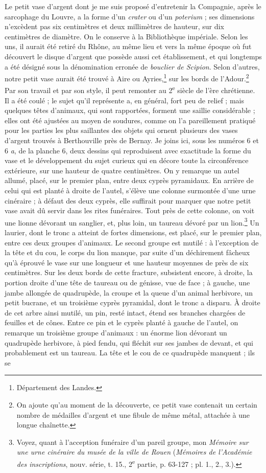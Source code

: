 \documentclass{article}
\begin{document}
Le petit vase d'argent dont je me suis proposé d'entretenir la Compagnie, après le sarcophage du Louvre, a la forme d'un \emph{crater} ou d'un \emph{poterium} ; ses dimensions n'excèdent pas six centimètres et deux millimètres de hauteur, sur dix centimètres de diamètre. On le conserve à la Bibliothèque impériale. Selon les uns, il aurait été retiré du Rhône, au même lieu et vers la même époque où fut découvert le disque d'argent que possède aussi cet établissement, et qui longtemps a été désigné sous la dénomination erronée de \emph{bouclier de Scipion}. Selon d'autres, notre petit vase aurait été trouvé à Aire ou Ayries,\footnote{Département des Landes.} sur les bords de l'Adour.\footnote{On ajoute qu'au moment de la découverte, ce petit vase contenait un certain nombre de médailles d'argent et une fibule de même métal, attachée à une longue chaînette.} Par son travail et par son style, il peut remonter au 2\textsuperscript{e} siècle de l'ère chrétienne. Il a été coulé ; le sujet qu'il représente a, en général, fort peu de relief ; mais quelques têtes d'animaux, qui sont rapportées, forment une saillie considérable ; elles ont été ajustées au moyen de soudures, comme on l'a pareillement pratiqué pour les parties les plus saillantes des objets qui ornent plusieurs des vases d'argent trouvés à Berthouville près de Bernay. Je joins ici, sous les numéros 6 et 6 \emph{a}, de la planche 6, deux dessins qui reproduisent avec exactitude la forme du vase et le développement du sujet curieux qui en décore toute la circonférence extérieure, sur une hauteur de quatre centimètres. On y remarque un autel allumé, placé, sur le premier plan, entre deux cyprès pyramidaux. En arrière de celui qui est planté à droite de l'autel, s'élève une colonne surmontée d'une urne cinéraire ; à défaut des deux cyprès, elle suffirait pour marquer que notre petit vase avait dû servir dans les rites funéraires. Tout près de cette colonne, on voit une lionne dévorant un sanglier, et, plus loin, un taureau dévoré par un lion.\footnote{Voyez, quant à l'acception funéraire d'un pareil groupe, mon \emph{Mémoire sur une urne cinéraire du musée de la ville de Rouen} (\emph{Mémoires de l'Académie des inscriptions}, nouv. série, t. 15., 2\textsuperscript{e} partie, p. 63-127 ; pl. 1., 2., 3.).} Un laurier, dont le tronc a atteint de fortes dimensions, est placé, sur le premier plan, entre ces deux groupes d'animaux. Le second groupe est mutilé : à l'exception de la tête et du cou, le corps du lion manque, par suite d'un déchirement fâcheux qu'à éprouvé le vase sur une longueur et une hauteur moyennes de près de six centimètres. Sur les deux bords de cette fracture, subsistent encore, à droite, la portion droite d'une tête de taureau ou de génisse, vue de face ; à gauche, une jambe allongée de quadrupède, la croupe et la queue d'un animal herbivore, un petit bucrane, et un troisième cyprès pyramidal, dont le tronc a disparu. À droite de cet arbre ainsi mutilé, un pin, resté intact, étend ses branches chargées de feuilles et de cônes. Entre ce pin et le cyprès planté à gauche de l'autel, on remarque un troisième groupe d'animaux : un énorme lion dévorant un quadrupède herbivore, à pied fendu, qui fléchit sur ses jambes de devant, et qui probablement est un taureau. La tête et le cou de ce quadrupède manquent ; ils se 
\end{document}
